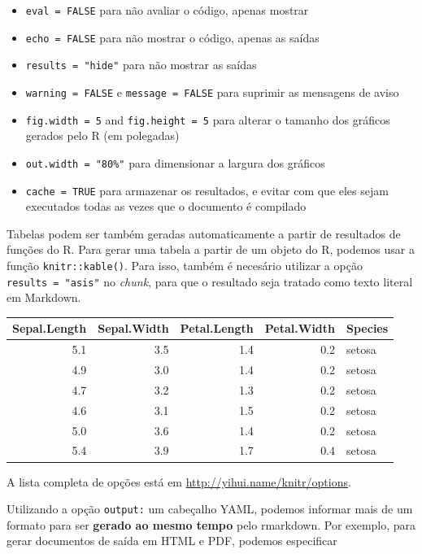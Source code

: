 \documentclass[10pt,a4paper]{book}
\providecommand{\tightlist}{%
  \setlength{\itemsep}{0pt}\setlength{\parskip}{0pt}}
\begin{document}
\begin{itemize}
\tightlist
\item
  \texttt{eval\ =\ FALSE} para não avaliar o código, apenas mostrar
\item
  \texttt{echo\ =\ FALSE} para não mostrar o código, apenas as saídas
\item
  \texttt{results\ =\ "hide"} para não mostrar as saídas
\item
  \texttt{warning\ =\ FALSE} e \texttt{message\ =\ FALSE} para suprimir
  as mensagens de aviso
\item
  \texttt{fig.width\ =\ 5} and \texttt{fig.height\ =\ 5} para alterar o
  tamanho dos gráficos gerados pelo R (em polegadas)
\item
  \texttt{out.width\ =\ "80\%"} para dimensionar a largura dos gráficos
\item
  \texttt{cache\ =\ TRUE} para armazenar os resultados, e evitar com que
  eles sejam executados todas as vezes que o documento é compilado
\end{itemize}

Tabelas podem ser também geradas automaticamente a partir de resultados
de funções do R. Para gerar uma tabela a partir de um objeto do R,
podemos usar a função \texttt{knitr::kable()}. Para isso, também é
necesário utilizar a opção \texttt{results\ =\ "asis"} no \emph{chunk},
para que o resultado seja tratado como texto literal em Markdown.

\begin{tabular}{r|r|r|r|l}
\hline
Sepal.Length & Sepal.Width & Petal.Length & Petal.Width & Species\\
\hline
5.1 & 3.5 & 1.4 & 0.2 & setosa\\
\hline
4.9 & 3.0 & 1.4 & 0.2 & setosa\\
\hline
4.7 & 3.2 & 1.3 & 0.2 & setosa\\
\hline
4.6 & 3.1 & 1.5 & 0.2 & setosa\\
\hline
5.0 & 3.6 & 1.4 & 0.2 & setosa\\
\hline
5.4 & 3.9 & 1.7 & 0.4 & setosa\\
\hline
\end{tabular}

A lista completa de opções está em
\url{http://yihui.name/knitr/options}.

Utilizando a opção \texttt{output:} um cabeçalho YAML, podemos informar
mais de um formato para ser \textbf{gerado ao mesmo tempo} pelo
rmarkdown. Por exemplo, para gerar documentos de saída em HTML e PDF,
podemos especificar
\end{document}

